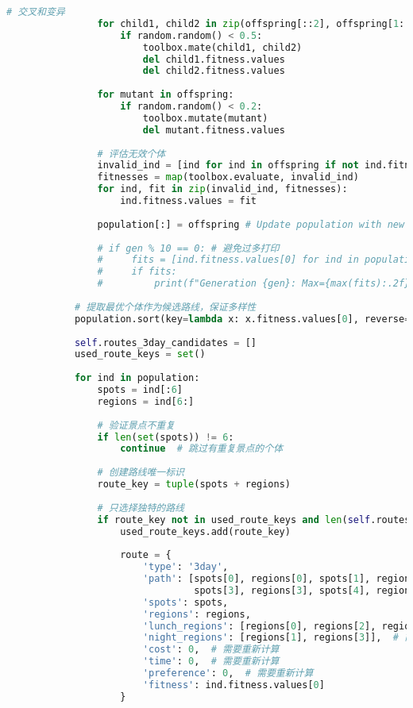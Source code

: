 \begin{lstlisting}[language=Python]
                # 交叉和变异
                for child1, child2 in zip(offspring[::2], offspring[1::2]):
                    if random.random() < 0.5:
                        toolbox.mate(child1, child2)
                        del child1.fitness.values
                        del child2.fitness.values
                
                for mutant in offspring:
                    if random.random() < 0.2:
                        toolbox.mutate(mutant)
                        del mutant.fitness.values
                
                # 评估无效个体
                invalid_ind = [ind for ind in offspring if not ind.fitness.valid]
                fitnesses = map(toolbox.evaluate, invalid_ind)
                for ind, fit in zip(invalid_ind, fitnesses):
                    ind.fitness.values = fit
                
                population[:] = offspring # Update population with new generation
                
                # if gen % 10 == 0: # 避免过多打印
                #     fits = [ind.fitness.values[0] for ind in population if ind.fitness.valid]
                #     if fits:
                #         print(f"Generation {gen}: Max={max(fits):.2f}, Avg={np.mean(fits):.2f}")
            
            # 提取最优个体作为候选路线，保证多样性
            population.sort(key=lambda x: x.fitness.values[0], reverse=True)
            
            self.routes_3day_candidates = []
            used_route_keys = set()
            
            for ind in population:
                spots = ind[:6]
                regions = ind[6:]
                
                # 验证景点不重复
                if len(set(spots)) != 6:
                    continue  # 跳过有重复景点的个体
                
                # 创建路线唯一标识
                route_key = tuple(spots + regions)
                
                # 只选择独特的路线
                if route_key not in used_route_keys and len(self.routes_3day_candidates) < candidate_size:
                    used_route_keys.add(route_key)
                    
                    route = {
                        'type': '3day',
                        'path': [spots[0], regions[0], spots[1], regions[1], spots[2], regions[2], 
                                 spots[3], regions[3], spots[4], regions[4], spots[5]],
                        'spots': spots,
                        'regions': regions,
                        'lunch_regions': [regions[0], regions[2], regions[4]],  # 3天的午餐
                        'night_regions': [regions[1], regions[3]],  # 前2天的住宿
                        'cost': 0,  # 需要重新计算
                        'time': 0,  # 需要重新计算
                        'preference': 0,  # 需要重新计算
                        'fitness': ind.fitness.values[0]
                    }
                    

\end{lstlisting}
